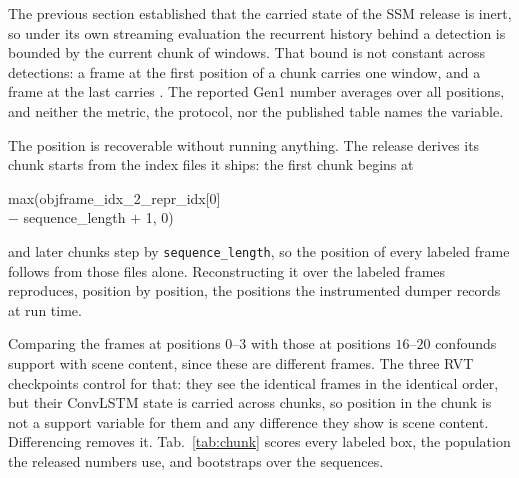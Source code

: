 \documentclass[10pt,twocolumn,letterpaper]{article}
\begin{document}
The previous section established that the carried state of the SSM release is inert, so
under its own streaming evaluation the recurrent history behind a detection is bounded by
the current chunk of \ssmEvalChunk{} windows. That bound is not constant across detections:
a frame at the first position of a chunk carries one window, and a frame at the last carries
\ssmEvalChunk{}. The reported Gen1 number averages over all \ssmEvalChunk{} positions, and
neither the metric, the protocol, nor the published table names the variable.

The position is recoverable without running anything. The release derives its chunk starts
from the index files it ships: the first chunk begins at
\begin{center}\footnotesize\ttfamily
max(objframe\_idx\_2\_repr\_idx[0]\\ $-$ sequence\_length $+$ 1, 0)
\end{center}
and later chunks step by \texttt{sequence\_length}, so the position of every labeled frame
follows from those files alone. Reconstructing it over the \mapFrames{} labeled frames reproduces, position by
position, the positions the instrumented dumper records at run time.

Comparing the frames at positions $0$--$3$ with those at positions $16$--$20$ confounds
support with scene content, since these are different frames. The three RVT checkpoints
control for that: they see the identical frames in the identical order, but their ConvLSTM
state is carried across chunks, so position in the chunk is not a support variable for them
and any difference they show is scene content. Differencing removes it. Tab.~\ref{tab:chunk}
scores every labeled box, the population the released numbers use, and bootstraps over the
\outSeqsScanned{} sequences.
\end{document}
